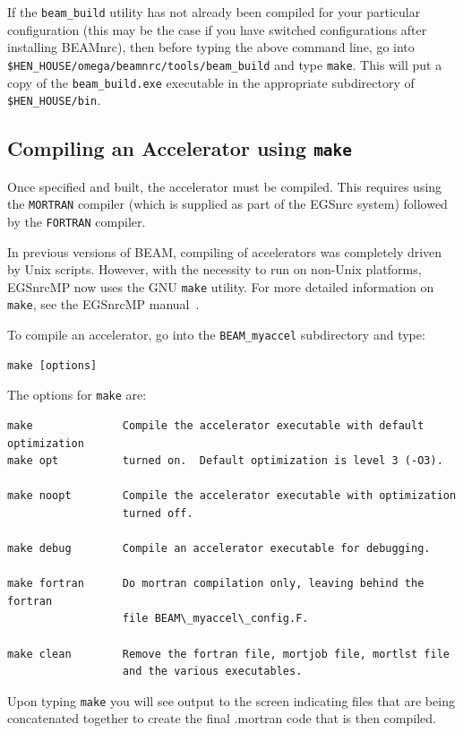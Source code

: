 \documentclass[12pt,twoside]{article}
\begin{document}
If the {\tt beam\_build} utility has not already been compiled for your particular
configuration (this may be the case if you have switched configurations
after installing BEAMnrc), then before typing the above command line, go into
{\tt \$HEN\_HOUSE/omega/beamnrc/tools/beam\_build} and type {\tt make}.  This
will put a copy of the {\tt beam\_build.exe} executable in the appropriate
subdirectory of {\tt \$HEN\_HOUSE/bin}.

\subsection{Compiling an Accelerator using {\tt make}}
\label{ca}

Once specified and built, the accelerator must be compiled. This
requires using the \verb+MORTRAN+ compiler (which is supplied as part of
the EGSnrc system) followed by the \verb+FORTRAN+ compiler.

In previous versions of BEAM, compiling of accelerators was completely
driven by Unix scripts.  However, with the necessity to run on non-Unix
platforms, EGSnrcMP now uses the GNU
{\tt make} utility.  For more detailed information on {\tt make}, see
the EGSnrcMP manual~\cite{Ka03}.

To compile an accelerator, go into the {\tt BEAM\_myaccel}
subdirectory and type:
\begin{verbatim}
make [options]
\end{verbatim}

The options for {\tt make} are:
\begin{verbatim}
make              Compile the accelerator executable with default optimization
make opt          turned on.  Default optimization is level 3 (-O3).

make noopt        Compile the accelerator executable with optimization
                  turned off.

make debug        Compile an accelerator executable for debugging.

make fortran      Do mortran compilation only, leaving behind the fortran
                  file BEAM\_myaccel\_config.F.

make clean        Remove the fortran file, mortjob file, mortlst file
                  and the various executables.
\end{verbatim}

Upon typing {\tt make} you will see output to the screen indicating files
that are being concatenated together to create the final .mortran code
that is then compiled.
\end{document}
